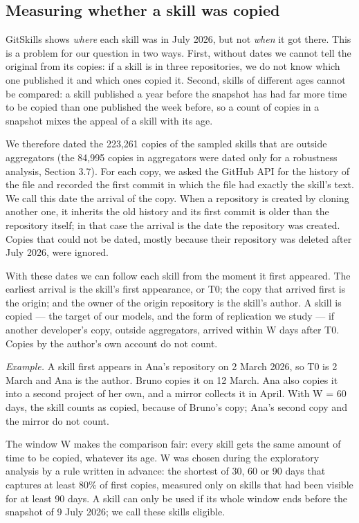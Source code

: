 \subsection{Measuring whether a skill was
copied}\label{measuring-whether-a-skill-was-copied}

GitSkills shows \emph{where} each skill was in July 2026, but not
\emph{when} it got there. This is a problem for our question in two
ways. First, without dates we cannot tell the original from its copies:
if a skill is in three repositories, we do not know which one published
it and which ones copied it. Second, skills of different ages cannot be
compared: a skill published a year before the snapshot has had far more
time to be copied than one published the week before, so a count of
copies in a snapshot mixes the appeal of a skill with its age.

We therefore dated the 223,261 copies of the sampled skills that are
outside aggregators (the 84,995 copies in aggregators were dated only
for a robustness analysis, Section 3.7). For each copy, we asked the
GitHub API for the history of the file and recorded the first commit in
which the file had exactly the skill's text. We call this date the
arrival of the copy. When a repository is created by cloning another
one, it inherits the old history and its first commit is older than the
repository itself; in that case the arrival is the date the repository
was created. Copies that could not be dated, mostly because their
repository was deleted after July 2026, were ignored.

With these dates we can follow each skill from the moment it first
appeared. The earliest arrival is the skill's first appearance, or T0;
the copy that arrived first is the origin; and the owner of the origin
repository is the skill's author. A skill is copied --- the target of
our models, and the form of replication we study --- if another
developer's copy, outside aggregators, arrived within W days after T0.
Copies by the author's own account do not count.

\emph{Example.} A skill first appears in Ana's repository on 2 March
2026, so T0 is 2 March and Ana is the author. Bruno copies it on 12
March. Ana also copies it into a second project of her own, and a mirror
collects it in April. With W = 60 days, the skill counts as copied,
because of Bruno's copy; Ana's second copy and the mirror do not count.

The window W makes the comparison fair: every skill gets the same amount
of time to be copied, whatever its age. W was chosen during the
exploratory analysis by a rule written in advance: the shortest of 30,
60 or 90 days that captures at least 80\% of first copies, measured only
on skills that had been visible for at least 90 days. A skill can only
be used if its whole window ends before the snapshot of 9 July 2026; we
call these skills eligible.

